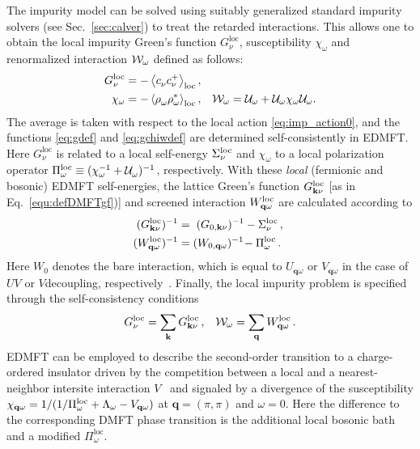 \documentclass[rmp,aps,reprint,amsmath,amssymb,superscriptaddress,showpacs,nofootinbib]{revtex4-1}
\newcommand{\kv}{\ensuremath{\mathbf{k}}}
\newcommand{\qv}{\ensuremath{\mathbf{q}}}
\newcommand{\av}[1]{\ensuremath{\left\langle #1 \right\rangle}}
\begin{document}
The impurity model can be solved using suitably generalized standard impurity solvers (see Sec.~\ref{sec:calver}) to treat the retarded interactions. This allows one to obtain the local impurity Green's function $G^{\text{loc}}_{\nu}$, susceptibility $\chi_{\omega}$ and renormalized interaction ${\cal W}_{\omega}$ defined as follows:
\begin{align}
G^{\text{loc}}_\nu = -\av{c^{\phantom{*}}_{\nu}c^{+}_{\nu}}_\text{loc},
\label{eq:gdef} &&\\
\chi_{\omega} = -\av{\rho^{\phantom{*}}_{\omega}\rho^{*}_{\omega}}_\text{loc}, &&
{\cal W}_{\omega} = {\cal U}_{\omega} + {\cal U}_{\omega}\chi_{\omega}{\cal U}_{\omega}.
\label{eq:gchiwdef}
\end{align}
The average is taken with respect to the local action \eqref{eq:imp_action0}, and the functions \eqref{eq:gdef} and \eqref{eq:gchiwdef} are determined self-consistently in EDMFT. Here $G^{\text{loc}}_\nu$ is related to a local self-energy $\Sigma^{\rm loc}_{\nu}$ and $\chi_\omega$ to a local polarization operator $\Pi^{\rm loc}_{\omega}\equiv (\chi^{-1}_{\omega}+{\cal U}^{\phantom{*}}_{\omega})^{-1}$, respectively. With these {\em local} (fermionic and bosonic) EDMFT self-energies, the lattice Green's function $G^{\rm loc}_{\kv\nu}$ [as in Eq.~\ref{equ:defDMFTgf})] and screened interaction $W^{\rm loc}_{\qv\omega}$ are calculated according to 
\begin{align}
\label{eq:WEDMFT}
  \!\!(G^{\rm loc}_{\kv\nu})^{-1} &= \hspace{0.1cm}(G_{0,\kv\nu})^{-1}-\Sigma^{\rm loc}_{\nu} \, ,\\
  \!\!(W^{\rm loc}_{\qv\omega})^{-1} &= (W_{0,\qv\omega})^{-1}\!-\Pi^{\rm loc}_{\omega} \, .
\end{align}
Here $W_{0}$ denotes the bare interaction, which is equal to $U_{\qv\omega}$ or $V_{\qv\omega}$ in the case of $UV$ or $V$decoupling, respectively~\cite{Ayral2012,Ayral2013}. Finally, the local impurity problem is specified through the self-consistency conditions
\begin{align}
\label{eq:edmftselfc}
  G^{\text{loc}}_\nu = \sum_{\kv} G^{\rm loc}_{\kv\nu} \, , &&
  {\cal W}_{\omega} =\sum_{\qv} W^{\rm loc}_{\qv\omega}  \, .
\end{align}
EDMFT can be employed to describe the second-order transition to a charge-ordered insulator driven by the competition between a local and a nearest-neighbor intersite interaction $V$~\cite{Sun02} and signaled by a divergence of the susceptibility $\chi_{\mathbf{q}\omega }=1/(1/\Pi_\omega^{\text{loc}}+\Lambda_\omega-V_{{\bf q}\omega})$ at $\mathbf{q}=(\pi,\pi)$ and $\omega=0$. Here the difference to the corresponding DMFT phase transition \cite{Wahle1998} is the additional local bosonic bath  and a modified $\Pi_\omega^{\text{loc}}$.
\end{document}
